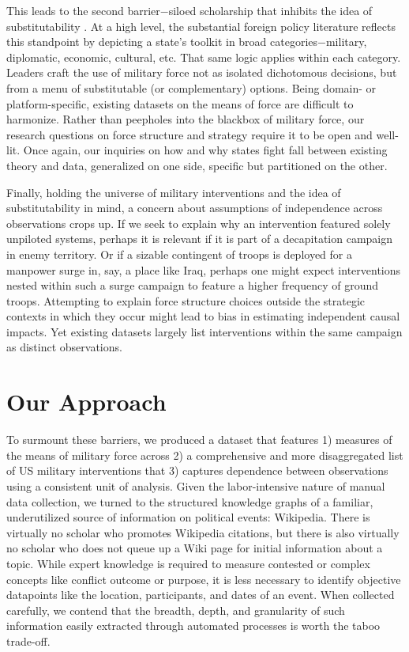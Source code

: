 \documentclass[fleqn,12pt]{article}
\begin{document}
This leads to the second barrier$-$siloed scholarship that inhibits the idea of substitutability \citep{MorganPalmer00}. At a high level, the substantial foreign policy literature reflects this standpoint by depicting a state's toolkit in broad categories$-$military, diplomatic, economic, cultural, etc. That same logic applies within each category. Leaders craft the use of military force not as isolated dichotomous decisions, but from a menu of substitutable (or complementary) options. Being domain- or platform-specific, existing datasets on the means of force are difficult to harmonize. Rather than peepholes into the blackbox of military force, our research questions on force structure and strategy require it to be open and well-lit. Once again, our inquiries on how and why states fight fall between existing theory and data, generalized on one side, specific but partitioned on the other.

Finally, holding the universe of military interventions and the idea of substitutability in mind, a concern about assumptions of independence across observations crops up. If we seek to explain why an intervention featured solely unpiloted systems, perhaps it is relevant if it is part of a decapitation campaign in enemy territory. Or if a sizable contingent of troops is deployed for a manpower surge in, say, a place like Iraq, perhaps one might expect interventions nested within such a surge campaign to feature a higher frequency of ground troops. Attempting to explain force structure choices outside the strategic contexts in which they occur might lead to bias in estimating independent causal impacts. Yet existing datasets largely list interventions within the same campaign as distinct observations.

\section*{Our Approach}
To surmount these barriers, we produced a dataset that features 1) measures of the means of military force across 2) a comprehensive and more disaggregated list of US military interventions that 3) captures dependence between observations using a consistent unit of analysis. Given the labor-intensive nature of manual data collection, we turned to the structured knowledge graphs of a familiar, underutilized source of information on political events: Wikipedia. There is virtually no scholar who promotes Wikipedia citations, but there is also virtually no scholar who does not queue up a Wiki page for initial information about a topic. While expert knowledge is required to measure contested or complex concepts like conflict outcome or purpose, it is less necessary to identify objective datapoints like the location, participants, and dates of an event. When collected carefully, we contend that the breadth, depth, and granularity of such information easily extracted through automated processes is worth the taboo trade-off.
\end{document}

